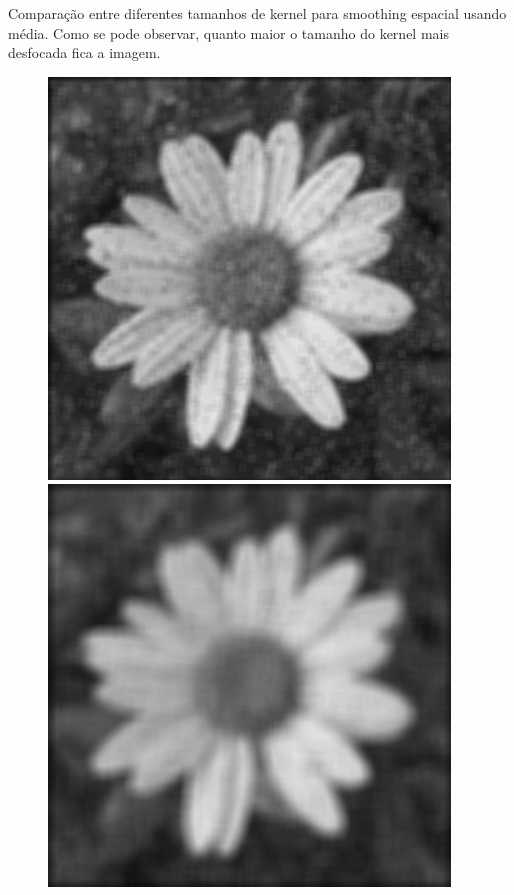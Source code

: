 \documentclass[a4paper]{report}
\begin{document}
Comparação entre diferentes tamanhos de kernel para smoothing espacial usando média. Como se pode observar, quanto maior o tamanho do kernel mais desfocada fica a imagem.
\begin{figure}[H]
\centering
\begin{minipage}{.3\textwidth}
  \centering
    \includegraphics[width=0.95\textwidth]{images/Smooth/spatial-salt-n-pepper/flower_smooth_spatial_average_5_0.8.png}
\end{minipage}%
\begin{minipage}{.3\textwidth}
  \centering
    \includegraphics[width=0.95\textwidth]{images/Smooth/spatial-salt-n-pepper/flower_smooth_spatial_average_10_0.8.png}

\end{minipage}
\end{figure}
\end{document}
